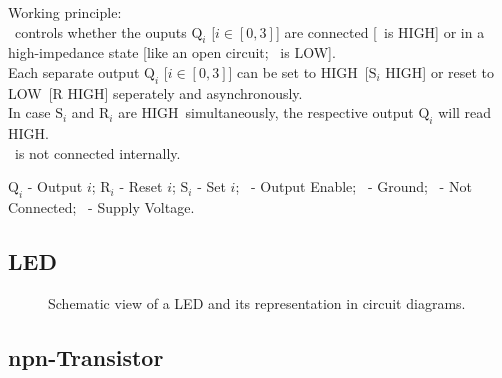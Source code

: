 \documentclass[english, parskip=half-, 11pt]{scrartcl}
\newcommand{\ground}{\text{GND}}
\newcommand{\vcc}{\text{VCC}}
\newcommand{\outputEnable}{\text{OE}}
\newcommand{\notConnected}{\text{NC}}
\newcommand{\signalHigh}{HIGH}
\newcommand{\signalLow}{LOW}
\newcommand{\latchReset}{\text{R}}
\newcommand{\latchSet}{\text{S}}
\newcommand{\latchOutput}{\text{Q}}
\newcommand{\latchOutputEnable}{\outputEnable}
\newcommand{\latchNotConnected}{\notConnected}
\begin{document}
Working principle:\\
\latchOutputEnable\ controls whether the ouputs $\latchOutput_i$ [$i \in [0,3]$] are connected [\latchOutputEnable\ is \signalHigh] or in a high-impedance state [like an open circuit; \latchOutputEnable\ is \signalLow].\\
Each separate output $\latchOutput_i$ [$i \in [0,3]$] can be set to \signalHigh\ [$\latchSet_i$ \signalHigh] or reset to \signalLow\ [$\latchReset$ \signalHigh] seperately and asynchronously.\\
In case $\latchSet_i$ and $\latchReset_i$ are \signalHigh\ simultaneously, the respective output $\latchOutput_i$ will read \signalHigh.\\
\latchNotConnected\ is not connected internally.

$\latchOutput_i$ - Output $i$; $\latchReset_i$ - Reset $i$; $\latchSet_i$ - Set $i$; \latchOutputEnable\ - Output Enable; \ground\ - Ground; \latchNotConnected\ - Not Connected; \vcc\ - Supply Voltage.


\subsection{LED}

\begin{figure}[H]
    \centering
    \caption{Schematic view of a LED and its representation in circuit diagrams.}
    \label{fig:led}
\end{figure}

\subsection{npn-Transistor}
\end{document}
